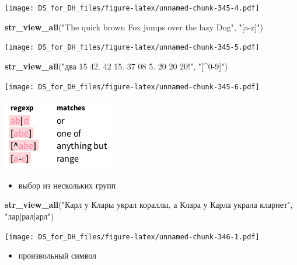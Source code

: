 \documentclass[
]{book}
\newenvironment{Shaded}{\begin{snugshade}}{\end{snugshade}}
\newcommand{\KeywordTok}[1]{\textcolor[rgb]{0.13,0.29,0.53}{\textbf{#1}}}
\newcommand{\NormalTok}[1]{#1}
\newcommand{\StringTok}[1]{\textcolor[rgb]{0.31,0.60,0.02}{#1}}
\providecommand{\tightlist}{%
  \setlength{\itemsep}{0pt}\setlength{\parskip}{0pt}}
\begin{document}
\texttt{[image: DS\_for\_DH\_files/figure-latex/unnamed-chunk-345-4.pdf]}

\begin{Shaded}
\begin{Highlighting}[]
\KeywordTok{str_view_all}\NormalTok{(}\StringTok{"The quick brown Fox jumps over the lazy Dog"}\NormalTok{, }\StringTok{"[a-z]"}\NormalTok{)}
\end{Highlighting}
\end{Shaded}

\texttt{[image: DS\_for\_DH\_files/figure-latex/unnamed-chunk-345-5.pdf]}

\begin{Shaded}
\begin{Highlighting}[]
\KeywordTok{str_view_all}\NormalTok{(}\StringTok{"два 15 42. 42 15. 37 08 5. 20 20 20!"}\NormalTok{, }\StringTok{"[^0-9]"}\NormalTok{)}
\end{Highlighting}
\end{Shaded}

\texttt{[image: DS\_for\_DH\_files/figure-latex/unnamed-chunk-345-6.pdf]}

\includegraphics{images/5.13_alternates.png}

\begin{itemize}
\tightlist
\item
  выбор из нескольких групп
\end{itemize}

\begin{Shaded}
\begin{Highlighting}[]
\KeywordTok{str_view_all}\NormalTok{(}\StringTok{"Карл у Клары украл кораллы, а Клара у Карла украла кларнет"}\NormalTok{, }\StringTok{"лар|рал|арл"}\NormalTok{)}
\end{Highlighting}
\end{Shaded}

\texttt{[image: DS\_for\_DH\_files/figure-latex/unnamed-chunk-346-1.pdf]}

\begin{itemize}
\tightlist
\item
  произвольный символ
\end{itemize}
\end{document}

